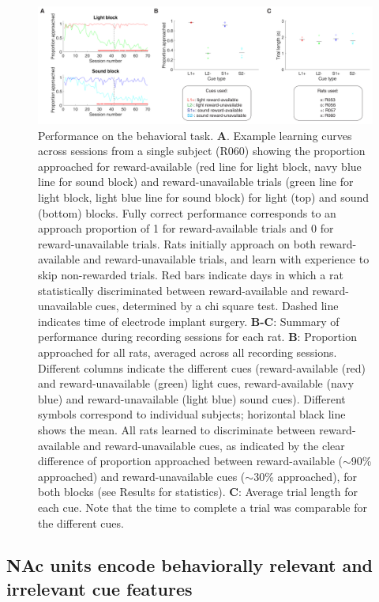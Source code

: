 \documentclass[11pt]{article}
\newcommand{\bsf}[1]{\textbf{#1}}
\begin{document}
 \begin{figure}[ht!]
\centering
\includegraphics[width=\textwidth]{Fig 3 - Behavioral results.pdf}
\caption{Performance on the behavioral task. \bsf{A}. Example learning curves
across sessions from a single subject (R060) showing the proportion approached
for reward-available (red line for light block, navy blue line for sound
block) and reward-unavailable trials (green line for light block, light blue
line for sound block) for light (top) and sound (bottom) blocks. Fully correct performance corresponds to an approach
proportion of 1 for reward-available trials and 0 for reward-unavailable
trials. Rats initially approach on both reward-available and
reward-unavailable trials, and learn with experience to skip non-rewarded
trials. Red bars indicate days in which a rat statistically discriminated
between reward-available and reward-unavailable cues, determined by a chi
square test. Dashed line indicates time of electrode implant
surgery. \bsf{B-C}: Summary of performance during recording sessions for each
rat. \bsf{B}: Proportion approached for all rats, averaged across all
recording sessions. Different columns indicate the different cues
(reward-available (red) and reward-unavailable (green) light cues,
reward-available (navy blue) and reward-unavailable (light blue) sound
cues). Different symbols correspond to individual subjects; horizontal black
line shows the mean. All rats learned to discriminate between reward-available
and reward-unavailable cues, as indicated by the clear difference of
proportion approached between reward-available ($\sim$90\% approached) and
reward-unavailable cues ($\sim$30\% approached), for both blocks (see Results
for statistics). \bsf{C}: Average trial length for each cue. Note that the
time to complete a trial was comparable for the different cues.}
\label{fig:behav}
\end{figure} \clearpage

\subsection*{NAc units encode behaviorally relevant and irrelevant cue features}
\end{document}
